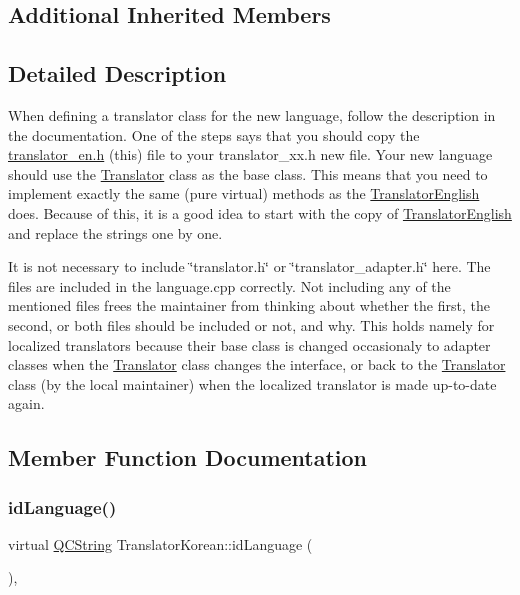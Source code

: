 \subsection*{Additional Inherited Members}


\subsection{Detailed Description}
When defining a translator class for the new language, follow the description in the documentation. One of the steps says that you should copy the \mbox{\hyperlink{translator__en_8h_source}{translator\+\_\+en.\+h}} (this) file to your translator\+\_\+xx.\+h new file. Your new language should use the \mbox{\hyperlink{class_translator}{Translator}} class as the base class. This means that you need to implement exactly the same (pure virtual) methods as the \mbox{\hyperlink{class_translator_english}{Translator\+English}} does. Because of this, it is a good idea to start with the copy of \mbox{\hyperlink{class_translator_english}{Translator\+English}} and replace the strings one by one.

It is not necessary to include \char`\"{}translator.\+h\char`\"{} or \char`\"{}translator\+\_\+adapter.\+h\char`\"{} here. The files are included in the language.\+cpp correctly. Not including any of the mentioned files frees the maintainer from thinking about whether the first, the second, or both files should be included or not, and why. This holds namely for localized translators because their base class is changed occasionaly to adapter classes when the \mbox{\hyperlink{class_translator}{Translator}} class changes the interface, or back to the \mbox{\hyperlink{class_translator}{Translator}} class (by the local maintainer) when the localized translator is made up-\/to-\/date again. 

\subsection{Member Function Documentation}
\mbox{\label{class_translator_korean_aa41f60e69b2c9cb5873fa7aff1625a49}} 
\subsubsection{\texorpdfstring{idLanguage()}{idLanguage()}}
{\footnotesize\ttfamily virtual \mbox{\hyperlink{class_q_c_string}{Q\+C\+String}} Translator\+Korean\+::id\+Language (\begin{DoxyParamCaption}{ }\end{DoxyParamCaption})\hspace{0.3cm}{\ttfamily [inline]}, {\ttfamily [virtual]}}

